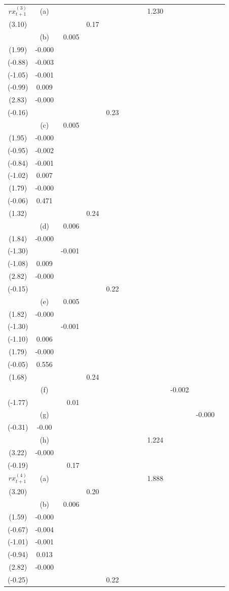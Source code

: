 \begin{table}[p]
\begin{tabular}{ccrrrrrrrrrr}
\hline
$rx^{(3)}_{t+1}$ & (a) &  &  &  &  &  &  & 1.230\\ (3.10) &  &  & 0.17\\
 & (b) & 0.005\\ (1.99) & -0.000\\ (-0.88) & -0.003\\ (-1.05) & -0.001\\ (-0.99) & 0.009\\ (2.83) & -0.000\\ (-0.16) &  &  &  & 0.23\\
 & (c) & 0.005\\ (1.95) & -0.000\\ (-0.95) & -0.002\\ (-0.84) & -0.001\\ (-1.02) & 0.007\\ (1.79) & -0.000\\ (-0.06) & 0.471\\ (1.32) &  &  & 0.24\\
 & (d) & 0.006\\ (1.84) & -0.000\\ (-1.30) &  & -0.001\\ (-1.08) & 0.009\\ (2.82) & -0.000\\ (-0.15) &  &  &  & 0.22\\
 & (e) & 0.005\\ (1.82) & -0.000\\ (-1.30) &  & -0.001\\ (-1.10) & 0.006\\ (1.79) & -0.000\\ (-0.05) & 0.556\\ (1.68) &  &  & 0.24\\
 & (f) &  &  &  &  &  &  &  & -0.002\\ (-1.77) &  & 0.01\\
 & (g) &  &  &  &  &  &  &  &  & -0.000\\ (-0.31) & -0.00\\
 & (h) &  &  &  &  &  &  & 1.224\\ (3.22) & -0.000\\ (-0.19) &  & 0.17\\
\hline
$rx^{(4)}_{t+1}$ & (a) &  &  &  &  &  &  & 1.888\\ (3.20) &  &  & 0.20\\
 & (b) & 0.006\\ (1.59) & -0.000\\ (-0.67) & -0.004\\ (-1.01) & -0.001\\ (-0.94) & 0.013\\ (2.82) & -0.000\\ (-0.25) &  &  &  & 0.22\\

\end{tabular}
\end{table}
